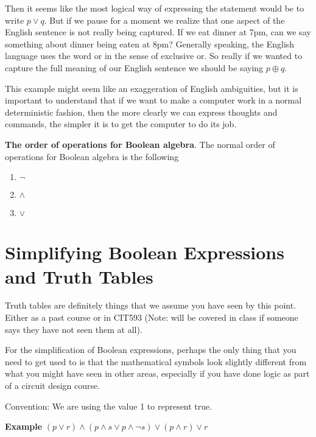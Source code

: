 \documentclass[12pt]{article}
\begin{document}
Then it seems like the most logical way of expressing the statement would be to write $p \vee q$. But if we pause for a moment we realize that one aspect of the English sentence is not really being captured. If we eat dinner at 7pm, can we say something about dinner being eaten at 8pm? Generally speaking, the English language uses the word or in the sense of exclusive or. So really if we wanted to capture the full meaning of our English sentence we should be saying $p \oplus q$.

This example might seem like an exaggeration of English ambiguities, but it is important to understand that if we want to make a computer work in a normal deterministic fashion, then the more clearly we can express thoughts and commands, the simpler it is to get the computer to do its job. 

\textbf{The order of operations for Boolean algebra}. The normal order of operations for Boolean algebra is the following

\begin{enumerate}
\item $\neg$
\item $\wedge$
\item $\vee$
\end{enumerate}

\section*{Simplifying Boolean Expressions and Truth Tables}

Truth tables are definitely things that we assume you have seen by this point. Either as a past course or in CIT593 (Note: will be covered in class if someone says they have not seen them at all).

For the simplification of Boolean expressions, perhaps the only thing that you need to get used to is that the mathematical symbols look slightly different from what you might have seen in other areas, especially if you have done logic as part of a circuit design course.

Convention: We are using the value 1 to represent true.

\medskip

\textbf{Example}
$(p \vee r) \wedge (p \wedge s \vee p \wedge \neg s) \vee (p \wedge r) \vee r$
\end{document}

